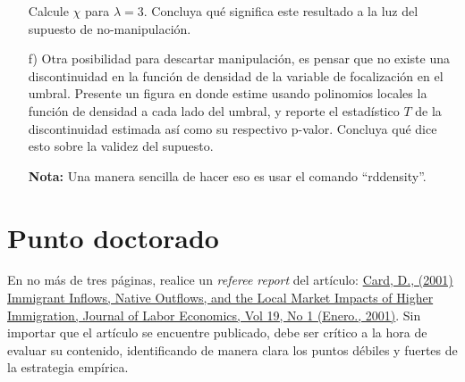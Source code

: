 \documentclass[a4paper]{article}
\begin{document}
\begin{itemize}
\begin{itemize}
    
    \end{itemize}
    
    Calcule $\chi$ para $\lambda=3$. Concluya qué significa este resultado a la luz del supuesto de no-manipulación.\\
    
        \item[f)] Otra posibilidad para descartar manipulación, es pensar que no existe una discontinuidad en la función de densidad de la variable de focalización en el umbral.  Presente un figura en donde estime usando polinomios locales la función de densidad a cada lado del umbral, y reporte el estadístico $T$ de la discontinuidad estimada así como su respectivo p-valor. Concluya qué dice esto sobre la validez del supuesto.
    
    \textbf{Nota:} Una manera sencilla de hacer eso es usar el comando ``rddensity''.
    
    
    \end{itemize}


    
\bigskip



\section*{Punto doctorado}

En no más de tres páginas, realice un \textit{referee report} del artículo: \href{https://davidcard.berkeley.edu/papers/immig-inflows.pdf}{Card, D., (2001) Immigrant Inflows, Native Outflows, and the Local Market Impacts of Higher Immigration, Journal of Labor Economics, Vol 19, No 1 (Enero., 2001)}. Sin importar que el artículo se encuentre publicado, debe ser crítico a la hora de evaluar su contenido, identificando de manera clara los puntos débiles y fuertes de la estrategia empírica. 


\bigskip
\end{document}
